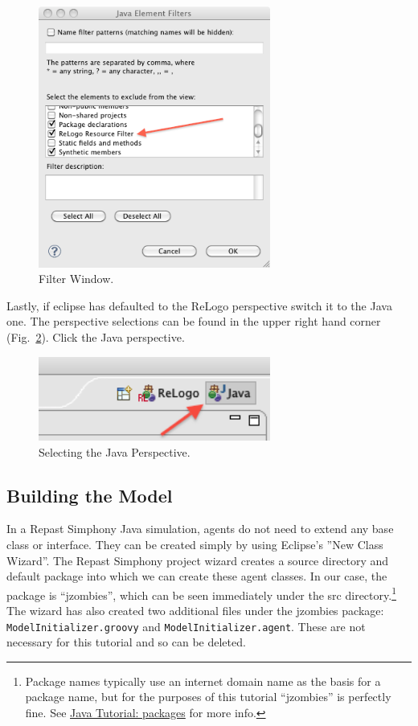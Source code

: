 \documentclass[11pt]{amsart}
\begin{document}
\begin{figure}[h]
\begin{center}
\vspace{.2in}
\centerline {
\includegraphics[width=3in]{GettingStartedImages/filter_window.png}
}
\caption{Filter Window.}
\label{fig:filter2}
\end{center}
\end{figure}

Lastly, if eclipse has defaulted to the ReLogo perspective switch it to the Java one. The perspective selections can be found in the upper right hand corner (Fig.~\ref{fig:javap}). Click the Java perspective.

\begin{figure}[h]
\begin{center}
\vspace{.2in}
\centerline {
\includegraphics[width=3in]{GettingStartedImages/perspectives.png}
}
\caption{Selecting the Java Perspective.}
\label{fig:javap}
\end{center}
\end{figure}

\subsection{Building the Model}
In a Repast Simphony Java simulation, agents do not need to extend any base class or interface. They can be created simply by using Eclipse's ''New Class Wizard''. The Repast Simphony project wizard creates a source directory and default package into which we can create these agent classes. In our case, the package is ``jzombies'', which can be seen immediately under the src directory.\footnote{Package names typically use an internet domain name as the basis for a package name, but for the purposes of this tutorial ``jzombies'' is perfectly fine. See  \href{http://download.oracle.com/javase/tutorial/java/package/namingpkgs.html}{Java Tutorial: packages} for more info.} The wizard has also created two additional files under the jzombies package: \texttt{ModelInitializer.groovy} and \texttt{ModelInitializer.agent}. These are not necessary for this tutorial and so can be deleted.
\end{document}
